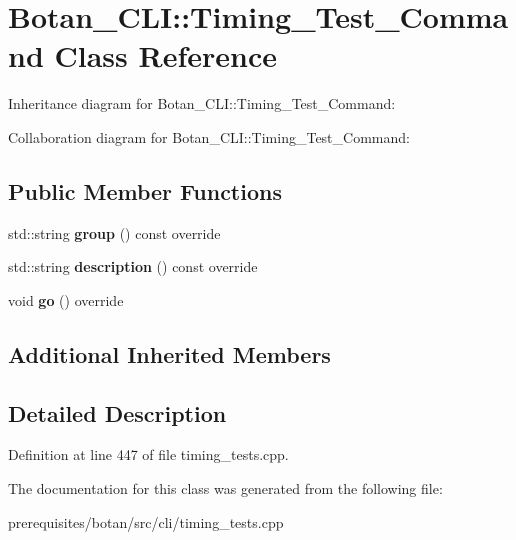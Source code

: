 \hypertarget{class_botan___c_l_i_1_1_timing___test___command}{}\section{Botan\+\_\+\+C\+LI\+:\+:Timing\+\_\+\+Test\+\_\+\+Command Class Reference}
\label{class_botan___c_l_i_1_1_timing___test___command}


Inheritance diagram for Botan\+\_\+\+C\+LI\+:\+:Timing\+\_\+\+Test\+\_\+\+Command\+:


Collaboration diagram for Botan\+\_\+\+C\+LI\+:\+:Timing\+\_\+\+Test\+\_\+\+Command\+:
\subsection*{Public Member Functions}
\begin{DoxyCompactItemize}
\item 
\mbox{\label{class_botan___c_l_i_1_1_timing___test___command_aa59773ad8fc8a0e7ea3ce1b169f8fbf8}} 
std\+::string {\bfseries group} () const override
\item 
\mbox{\label{class_botan___c_l_i_1_1_timing___test___command_a2c8b1d1cdb47f67cc49cce68e9f6f36c}} 
std\+::string {\bfseries description} () const override
\item 
\mbox{\label{class_botan___c_l_i_1_1_timing___test___command_ade93e39bbf3f11382654163641aa3575}} 
void {\bfseries go} () override
\end{DoxyCompactItemize}
\subsection*{Additional Inherited Members}


\subsection{Detailed Description}


Definition at line 447 of file timing\+\_\+tests.\+cpp.



The documentation for this class was generated from the following file\+:\begin{DoxyCompactItemize}
\item 
prerequisites/botan/src/cli/timing\+\_\+tests.\+cpp\end{DoxyCompactItemize}

